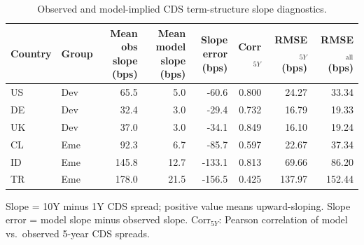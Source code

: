 \begin{table}[H]
\centering
\caption{Observed and model-implied CDS term-structure slope diagnostics.}
\label{tab:cds_term_structure_fit}
\begin{tabular}{llrrrrrr}
\toprule
Country & Group & Mean obs slope (bps) & Mean model slope (bps) & Slope error (bps) & Corr$_{5Y}$ & RMSE$_{5Y}$ (bps) & RMSE$_\text{all}$ (bps) \\
\midrule
US & Dev & 65.5 & 5.0 & -60.6 & 0.800 & 24.27 & 33.34 \\
DE & Dev & 32.4 & 3.0 & -29.4 & 0.732 & 16.79 & 19.33 \\
UK & Dev & 37.0 & 3.0 & -34.1 & 0.849 & 16.10 & 19.24 \\
CL & Eme & 92.3 & 6.7 & -85.7 & 0.597 & 22.67 & 37.34 \\
ID & Eme & 145.8 & 12.7 & -133.1 & 0.813 & 69.66 & 86.20 \\
TR & Eme & 178.0 & 21.5 & -156.5 & 0.425 & 137.97 & 152.44 \\
\bottomrule
\end{tabular}
\begin{tablenotes}[flushleft]\footnotesize
\item Slope = 10Y minus 1Y CDS spread; positive value means upward-sloping. Slope error = model slope minus observed slope. Corr$_{5Y}$: Pearson correlation of model vs.\ observed 5-year CDS spreads.
\end{tablenotes}
\end{table}
